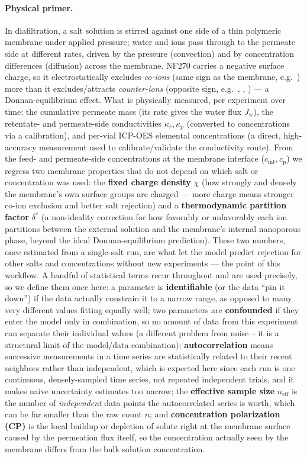 \documentclass[11pt]{article}
\newcommand{\Jw}{J_{\mathrm{w}}}
\newcommand{\dstar}{\delta^{*}}
\newcommand{\cint}{c_{\mathrm{int}}}
\newcommand{\cp}{c_{\mathrm{p}}}
\begin{document}
\paragraph{Physical primer.} In diafiltration, a salt solution is stirred
against one side of a thin polymeric membrane under applied pressure; water
and ions pass through to the permeate side at different rates, driven by the
pressure (convection) and by concentration differences (diffusion) across the
membrane. NF270 carries a negative surface charge, so it electrostatically
excludes \emph{co-ions} (same sign as the membrane, e.g.\ ) more than
it excludes/attracts \emph{counter-ions} (opposite sign, e.g.\ ,
, ) --- a Donnan-equilibrium effect. What is
physically measured, per experiment over time: the cumulative permeate mass
(its rate gives the water flux $\Jw$), the retentate- and permeate-side
conductivities $\kappa_r,\kappa_p$ (converted to concentrations via a
calibration), and per-vial ICP-OES elemental concentrations (a direct,
high-accuracy measurement used to calibrate/validate the conductivity route).
From the feed- and permeate-side concentrations at the membrane interface
($\cint,\cp$) we regress two membrane properties that do not depend on which
salt or concentration was used: the \textbf{fixed charge density} $\chi$ (how
strongly and densely the membrane's own surface groups are charged --- more
charge means stronger co-ion exclusion and better salt rejection) and a
\textbf{thermodynamic partition factor} $\dstar$ (a non-ideality correction
for how favorably or unfavorably each ion partitions between the external
solution and the membrane's internal nanoporous phase, beyond the ideal
Donnan-equilibrium prediction). These two numbers, once estimated from a
single-salt run, are what let the model predict rejection for other salts and
concentrations without new experiments --- the point of this workflow.
A handful of statistical terms recur throughout and are used precisely, so we
define them once here: a parameter is \textbf{identifiable} (or the data
``pin it down'') if the data actually constrain it to a narrow range, as
opposed to many very different values fitting equally well; two parameters
are \textbf{confounded} if they enter the model only in combination, so no
amount of data from this experiment can separate their individual values (a
different problem from noise -- it is a structural limit of the model/data
combination); \textbf{autocorrelation} means successive measurements in a
time series are statistically related to their recent neighbors rather than
independent, which is expected here since each run is one continuous,
densely-sampled time series, not repeated independent trials, and it makes
naive uncertainty estimates too narrow; the \textbf{effective sample size}
$n_{\mathrm{eff}}$ is the number of \emph{independent} data points the
autocorrelated series is worth, which can be far smaller than the raw count
$n$; and \textbf{concentration polarization (CP)} is the local buildup or
depletion of solute right at the membrane surface caused by the permeation
flux itself, so the concentration actually seen by the membrane differs from
the bulk solution concentration.
\end{document}
